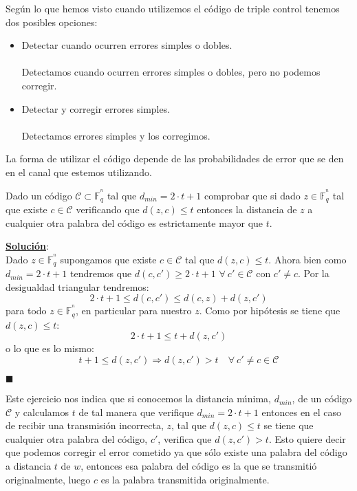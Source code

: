 Seg\'un lo que hemos visto cuando utilizemos el c\'odigo de triple control
tenemos dos posibles opciones:
\begin{itemize}
\item Detectar cuando ocurren errores simples o dobles.\\ \\
Detectamos cuando ocurren errores simples o dobles, pero no podemos corregir.
\item Detectar y corregir errores simples.\\ \\
Detectamos errores simples y los corregimos.
\end{itemize}

La forma de utilizar el c\'odigo depende de las probabilidades de error que
se den en el canal que estemos utilizando.
%
\newpage
%

%
%
\begin{ejercicio}
Dado un c\'odigo $\mathcal{C}\subset \mathbb{F}^{^n}_q$ tal que
$d_{min} = 2\cdot t + 1$ comprobar que si dado
$z\in \mathbb{F}^{^n}_q$ tal que existe $c\in \mathcal{C}$ verificando que
$d(z,c)\leq t$ entonces la distancia de $z$ a cualquier otra palabra del
c\'odigo es estrictamente mayor que $t$.
\end{ejercicio}
\underline{\textbf{Soluci\'on}}:\\
Dado $z\in \mathbb{F}^{^n}_q$ supongamos que existe $c\in \mathcal{C}$ tal que
$d(z,c)\leq t$. Ahora bien como $d_{min} = 2\cdot t+1$ tendremos que
$d(c,c')\geq 2\cdot t+1$ $\forall \ c'\in \mathcal{C}$ con $c'\neq c$.
Por la desigualdad triangular tendremos:
\begin{displaymath}
2\cdot t+1 \leq d(c,c')\leq d(c,z)+d(z,c')
\end{displaymath}
para todo $z\in \mathbb{F}^{^n}_q$, en particular para nuestro $z$. Como por
hip\'otesis se tiene que $d(z,c)\leq t$:
\begin{displaymath}
2\cdot t +1 \leq t + d(z,c')
\end{displaymath}
o lo que es lo mismo:
\begin{displaymath}
t + 1 \leq d(z,c') \Longrightarrow d(z,c') > t\quad \forall \ c'\neq c \in \mathcal{C}
\end{displaymath}
\begin{flushright}
$\blacksquare$
\end{flushright}

Este ejercicio nos indica que si conocemos la distancia m\'{\i}nima, $d_{min}$,
de un c\'odigo $\mathcal{C}$ y calculamos $t$ de tal manera que verifique
$d_{min} = 2\cdot t +1$ entonces en el caso de recibir una transmisi\'on 
incorrecta, $z$, tal que $d(z,c)\leq t$ se tiene que cualquier otra palabra del
c\'odigo, $c'$, verifica que $d(z,c')> t$. Esto quiere decir que podemos
corregir el error cometido ya que s\'olo existe una palabra del c\'odigo
a distancia $t$ de $w$, entonces esa palabra del c\'odigo es la que se
transmiti\'o originalmente, luego $c$ es la palabra transmitida originalmente.
